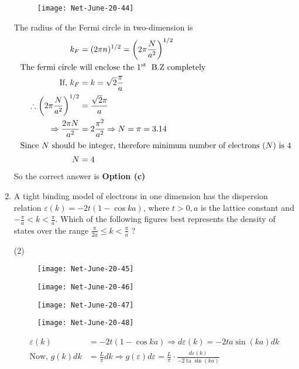 \begin{enumerate}
\begin{answer}
\begin{figure}[H]
		\centering
		\texttt{[image: Net-June-20-44]}
	\end{figure}
	The radius of the Fermi circle in two-dimension is
	\begin{align*}
	k_{F}&=(2 \pi n)^{1 / 2}=\left(2 \pi \frac{N}{a^{2}}\right)^{1 / 2}\\
\text{	The fermi circle }&\text{will enclose the $1^{\text {st }}$ B.Z completely}\\
	\text{If, }k_{F}&=k=\sqrt{2} \frac{\pi}{a}\\
	\therefore\left(2 \pi \frac{N}{a^{2}}\right)^{1 / 2}&=\frac{\sqrt{2} \pi}{a} \\
	\Rightarrow \frac{2 \pi N}{a^{2}}&=2 \frac{\pi^{2}}{a^{2}} \Rightarrow N=\pi=3.14\\
\intertext{	Since $N$ should be integer, therefore minimum number of electrons $(N)$ is 4}
	N&=4
	\end{align*}
		So the correct answer is \textbf{Option (c)}
\end{answer}
\item A tight binding model of electrons in one dimension has the dispersion relation $\varepsilon(k)=-2 t(1-\cos k a)$, where $t>0, a$ is the lattice constant and $-\frac{\pi}{a}<k<\frac{\pi}{a}$. Which of the following figures best represents the density of states over the range $\frac{\pi}{2 a} \leq k<\frac{\pi}{a}$ ?
 \begin{tasks}(2)
	\task[\textbf{a.}]
	\begin{figure}[H]
		\centering
		\texttt{[image: Net-June-20-45]}
	\end{figure}
	\task[\textbf{b.}]
	\begin{figure}[H]
		\centering
		\texttt{[image: Net-June-20-46]}
	\end{figure}
	\task[\textbf{c.}]
	\begin{figure}[H]
		\centering
		\texttt{[image: Net-June-20-47]}
	\end{figure}
	\task[\textbf{d.}] 
	\begin{figure}[H]
		\centering
		\texttt{[image: Net-June-20-48]}
	\end{figure}
\end{tasks}
\begin{answer}
	\begin{align*}
	\varepsilon(k)&=-2 t(1-\cos k a) \Rightarrow d \varepsilon(k)=-2 t a \sin (k a) d k\\
	\text{Now, }g(k) d k&=\frac{L}{\pi} d k \Rightarrow g(\varepsilon) d \varepsilon=\frac{L}{\pi} \cdot \frac{d \varepsilon(k)}{-2 \operatorname{ta} \sin (k a)}\\

\end{align*}
\end{answer}
\end{enumerate}
